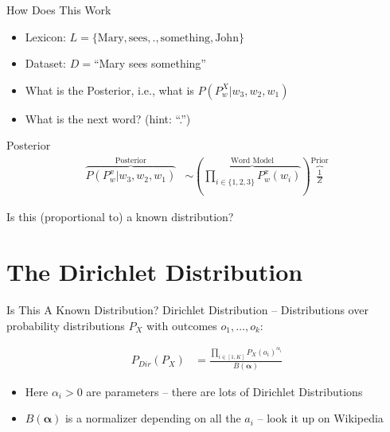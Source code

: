 \documentclass[11pt]{beamer}
\begin{document}
	\begin{frame}{How Does This Work}
		\begin{itemize}
			\item Lexicon: $L = \lbrace \text{Mary}, \text{sees}, \text{.}, \text{something}, \text{John}  \rbrace$
			\item Dataset: $D=$``Mary sees something''
			\item What is the Posterior, i.e., what is $P(P_{w}^X \vert w_3,w_2,w_1)$
			\item What is the next word? (hint: ``.'')
		\end{itemize}
	\end{frame}
	
	\begin{frame}{Posterior}
		\begin{align*}
			\overbrace{P(P_{w}^x \vert w_3,w_2,w_1)}^{\text{Posterior}} & \sim \left(\overbrace{\prod_{i \in \{1,2,3\}} P_{w}^{x}(w_i)}^{\text{Word Model}}\right) \overbrace{\frac{1}{Z}}^{\text{Prior}}
		\end{align*}
		
		\vspace{10pt} Is this (proportional to) a known distribution?
	\end{frame}
	
	\section{The Dirichlet Distribution}
	
	\begin{frame}{Is This A Known Distribution?}
		Dirichlet Distribution -- Distributions over probability distributions $P_X$ with outcomes $o_1,\dots,o_k$:
		
		\begin{align*}
			P_{Dir}(P_X) & = \frac{\prod_{i \in [1,K]} P_{X}(o_i)^{\alpha_i}}{B(\boldsymbol{\alpha})}
		\end{align*}
		
		\vspace{10pt} \begin{itemize}
			\item Here	$\alpha_i > 0$ are parameters -- there are lots of Dirichlet Distributions
			\item $B(\boldsymbol{\alpha})$ is a normalizer depending on all the $a_i$ -- look it up on Wikipedia
		\end{itemize}
	\end{frame}
	
\end{document}

